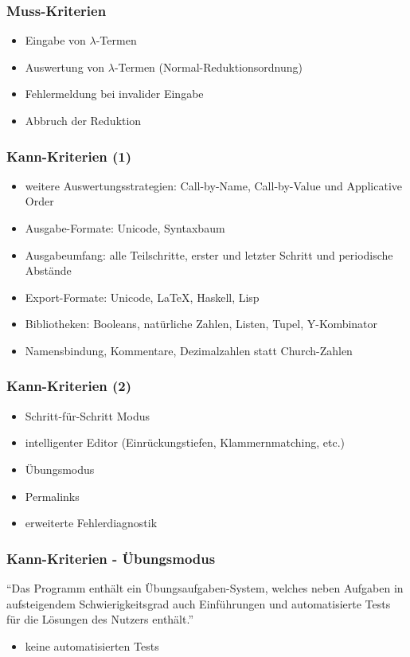 \documentclass[10pt]{beamer}
\begin{document}
\begin{frame}
\frametitle{Muss-Kriterien}
\begin{itemize}
\item Eingabe von $\lambda$-Termen
\item Auswertung von $\lambda$-Termen (Normal-Reduktionsordnung)
\item Fehlermeldung bei invalider Eingabe
\item Abbruch der Reduktion
\end{itemize}
\end{frame}

\begin{frame}
\frametitle{Kann-Kriterien (1)}
\begin{itemize}
\item weitere Auswertungsstrategien: Call-by-Name, Call-by-Value und Applicative Order
\item Ausgabe-Formate: Unicode, Syntaxbaum
\item Ausgabeumfang: alle Teilschritte, erster und letzter Schritt und periodische Abstände
\item Export-Formate: Unicode, \LaTeX, Haskell, Lisp
\item Bibliotheken: Booleans, natürliche Zahlen, Listen, Tupel, Y-Kombinator
\item Namensbindung, Kommentare, Dezimalzahlen statt Church-Zahlen
\end{itemize}
\end{frame}

\begin{frame}
\frametitle{Kann-Kriterien (2)}
\begin{itemize}
\item Schritt-für-Schritt Modus
\item intelligenter Editor (Einrückungstiefen, Klammernmatching, etc.)
\item Übungsmodus
\item Permalinks
\item erweiterte Fehlerdiagnostik
\end{itemize}
\end{frame}

\begin{frame}
\frametitle{Kann-Kriterien - \alert{Übungsmodus}}
\enquote{Das Programm enthält ein Übungsaufgaben-System, welches neben Aufgaben in aufsteigendem
Schwierigkeitsgrad auch Einführungen und automatisierte Tests für die Lösungen des Nutzers
enthält.}
\begin{itemize}
\item keine automatisierten Tests
\end{itemize}
\end{frame}
\end{document}
